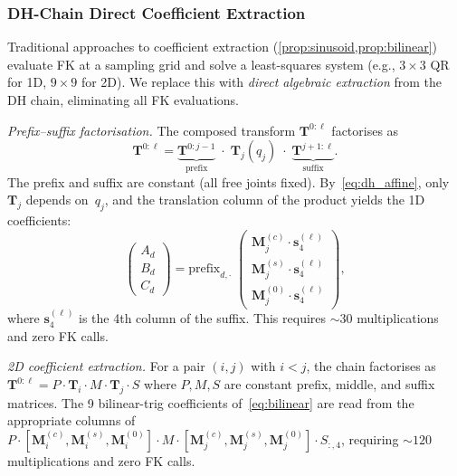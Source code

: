 \documentclass[journal]{IEEEtran}
\newcommand{\bT}{\mathbf{T}}
\begin{document}

\subsubsection{DH-Chain Direct Coefficient Extraction}%
\label{sec:dh_coeff}


Traditional approaches to coefficient extraction
(\cref{prop:sinusoid,prop:bilinear}) evaluate FK at a sampling grid
and solve a least-squares system (e.g., $3{\times}3$ QR for 1D,
$9{\times}9$ for 2D).
We replace this with \emph{direct algebraic extraction} from the
DH chain, eliminating all FK evaluations.

\emph{Prefix--suffix factorisation.}
The composed transform $\bT^{0:\ell}$ factorises as
\begin{equation}\label{eq:prefix_suffix}
  \bT^{0:\ell} = \underbrace{\bT^{0:j-1}}_\text{prefix}
  \;\cdot\; \bT_j(q_j)
  \;\cdot\; \underbrace{\bT^{j+1:\ell}}_\text{suffix}.
\end{equation}
The prefix and suffix are constant (all free joints fixed).
By~\eqref{eq:dh_affine}, only $\bT_j$ depends on~$q_j$,
and the translation column of the product yields the 1D coefficients:
\begin{equation}\label{eq:1d_direct}
  \begin{pmatrix} A_d \\ B_d \\ C_d \end{pmatrix}
  = \text{prefix}_{d,\cdot} \;
  \begin{pmatrix}
    \bm{M}_j^{(c)} \cdot \bm{s}^{(\ell)}_{4} \\
    \bm{M}_j^{(s)} \cdot \bm{s}^{(\ell)}_{4} \\
    \bm{M}_j^{(0)} \cdot \bm{s}^{(\ell)}_{4}
  \end{pmatrix},
\end{equation}
where $\bm{s}^{(\ell)}_4$ is the 4th column of the suffix.
This requires ${\sim}30$ multiplications and zero FK calls.

\emph{2D coefficient extraction.}
For a pair $(i,j)$ with $i < j$, the chain factorises as
$\bT^{0:\ell} = P \cdot \bT_i \cdot M \cdot \bT_j \cdot S$
where $P,M,S$ are constant prefix, middle, and suffix matrices.
The 9 bilinear-trig coefficients of~\eqref{eq:bilinear} are read
from the appropriate columns of $P \cdot [\bm{M}_i^{(c)}, \bm{M}_i^{(s)},
\bm{M}_i^{(0)}] \cdot M \cdot [\bm{M}_j^{(c)}, \bm{M}_j^{(s)}, \bm{M}_j^{(0)}]
\cdot S_{:,4}$,
requiring ${\sim}120$ multiplications and zero FK calls.
\end{document}
